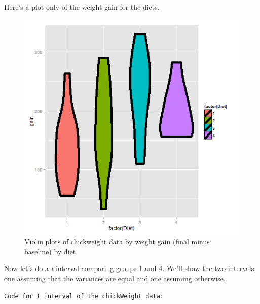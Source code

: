 \documentclass[]{article}
\newenvironment{Shaded}{\begin{snugshade}}{\end{snugshade}}
\newcommand{\KeywordTok}[1]{\textcolor[rgb]{0.13,0.29,0.53}{\textbf{{#1}}}}
\newcommand{\DataTypeTok}[1]{\textcolor[rgb]{0.13,0.29,0.53}{{#1}}}
\newcommand{\DecValTok}[1]{\textcolor[rgb]{0.00,0.00,0.81}{{#1}}}
\newcommand{\StringTok}[1]{\textcolor[rgb]{0.31,0.60,0.02}{{#1}}}
\newcommand{\OtherTok}[1]{\textcolor[rgb]{0.56,0.35,0.01}{{#1}}}
\newcommand{\NormalTok}[1]{{#1}}
\begin{document}
Here's a plot only of the weight gain for the diets.

\begin{figure}[htbp]
\centering
\includegraphics{LeanPub/images/chickweightgroups-1.png}
\caption{Violin plots of chickweight data by weight gain (final minus
baseline) by diet.}
\end{figure}

Now let's do a \emph{t} interval comparing groups 1 and 4. We'll show
the two intervals, one assuming that the variances are equal and one
assuming otherwise.

\vspace{1pc}

\verb;Code for t interval of the chickWeight data:;

\begin{Shaded}
\end{Shaded}
\end{document}
